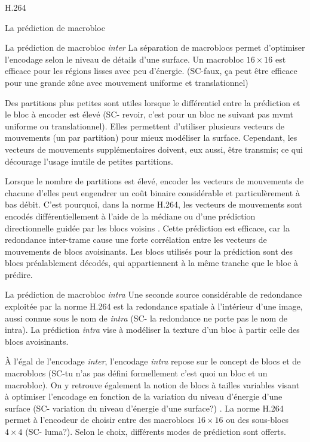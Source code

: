 \documentclass{article}
\begin{document}
\begin{section}{H.264}
\begin{subsection}{La prédiction de macrobloc}
\begin{subsubsection}{La prédiction de macrobloc \textit{inter}}
La séparation de macroblocs permet d'optimiser l'encodage selon le niveau de
détails d'une surface. Un macrobloc $16 \times 16$ est efficace pour les 
régions lisses avec peu d'énergie. (SC-faux, ça peut être efficace pour une grande zône avec mouvement uniforme et translationnel)

Des partitions plus petites sont utiles
lorsque le différentiel entre la prédiction et le bloc à encoder est élevé (SC- revoir, c'est pour un bloc ne suivant pas mvmt uniforme ou translationnel).
Elles permettent d'utiliser plusieurs vecteurs de mouvements (un par partition)
pour mieux modéliser la surface. Cependant, les vecteurs de mouvements 
supplémentaires doivent, eux aussi, être transmis; ce qui décourage l'usage inutile de petites partitions.

Lorsque le nombre de partitions est élevé, encoder les vecteurs de mouvements 
de chacune d'elles peut engendrer un coût binaire considérable et particulèrement à bas débit. C'est
pourquoi, dans la norme H.264, les vecteurs de mouvements sont encodés
différentiellement à l'aide de la médiane ou d'une prédiction directionnelle
guidée par les blocs voisins \cite{wiegand2003}. Cette prédiction est 
efficace, car la redondance inter-trame cause une forte corrélation entre les
vecteurs de mouvements de blocs avoisinants. Les blocs utilisés pour la
prédiction sont des blocs préalablement décodés, qui appartiennent à la même
tranche que le bloc à prédire.
\end{subsubsection}

\begin{subsubsection}{La prédiction de macrobloc \textit{intra}}
Une seconde source considérable de redondance exploitée par la norme H.264 est
la redondance spatiale à l'intérieur d'une image, aussi connue sous le nom de
\textit{intra} (SC- la redondance ne porte pas le nom de intra). La prédiction \textit{intra} vise à modéliser la texture d'un
bloc à partir celle des blocs avoisinants.

À l'égal de l'encodage \textit{inter}, l'encodage \textit{intra} repose sur le
concept de blocs et de macroblocs (SC-tu n'as pas défini formellement c'est quoi un bloc et un macrobloc). On y retrouve également la notion de
blocs à tailles variables visant à optimiser l'encodage en fonction de la
variation du niveau d'énergie d'une surface (SC- variation du niveau d'énergie d'une surface?) . La norme H.264 permet à l'encodeur
de choisir entre des macroblocs $16 \times 16$ ou des sous-blocs $4 \times 4$ (SC- luma?).
Selon le choix, différents modes de prédiction sont offerts.


\end{subsubsection}
\end{subsection}
\end{section}
\end{document}
